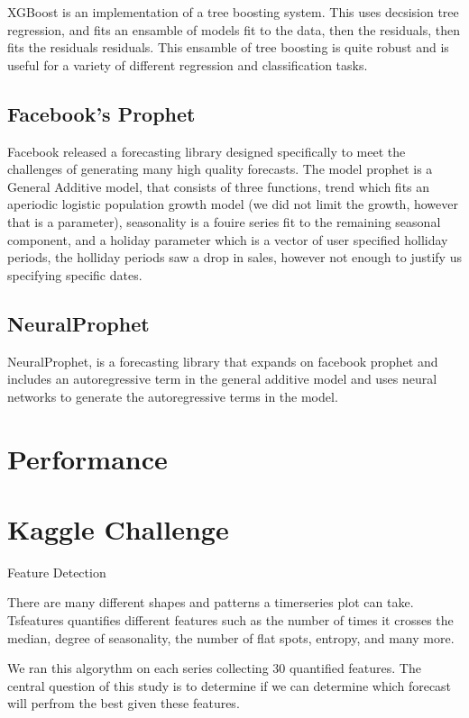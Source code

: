 \documentclass[16pt,twocolumn,letterpaper]{article}
\begin{document}
XGBoost is an implementation of a tree boosting system. This uses decsision tree regression, and fits an ensamble of models fit to the data, then the residuals, then fits the residuals residuals. This ensamble of tree boosting is quite robust and is useful for a variety of different regression and classification tasks.

\subsection{Facebook's Prophet}

Facebook released a forecasting library designed specifically to meet the challenges of generating many high quality forecasts. The model prophet is a General Additive model, that consists of three functions, trend which fits an aperiodic logistic population growth model (we did not limit the growth, however that is a parameter), seasonality is a fouire series fit to the remaining seasonal component, and a holiday parameter which is a vector of user specified holliday periods, the holliday periods saw a drop in sales, however not enough to justify us specifying specific dates. 

\subsection{NeuralProphet}

NeuralProphet, is a forecasting library that expands on facebook prophet and includes an autoregressive term in the general additive model and uses neural networks to generate the autoregressive terms in the model.

\section{Performance}

\section{Kaggle Challenge}

Feature Detection

There are many different shapes and patterns a timerseries plot can take. Tsfeatures \cite{montero2020fforma} quantifies different features such as the number of times it crosses the median, degree of seasonality, the number of flat spots, entropy, and many more. 

We ran this algorythm on each series collecting 30 quantified features. The central question of this study is to determine if we can determine which forecast will perfrom the best given these features. 
\end{document}
